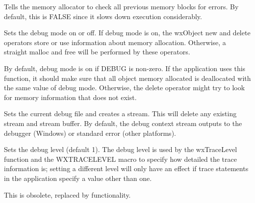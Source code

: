 \label{wxdebugcontextsetcheckprevious}


Tells the memory allocator to check all previous memory blocks for errors.
By default, this is FALSE since it slows down execution considerably.



\label{wxdebugcontextsetdebugmode}


Sets the debug mode on or off. If debug mode is on, the wxObject new and delete
operators store or use information about memory allocation. Otherwise,
a straight malloc and free will be performed by these operators.

By default, debug mode is on if DEBUG is non-zero. If the application
uses this function, it should make sure that all object memory allocated
is deallocated with the same value of debug mode. Otherwise, the
delete operator might try to look for memory information that does not
exist.



\label{wxdebugcontextsetfile}


Sets the current debug file and creates a stream. This will delete any existing
stream and stream buffer. By default, the debug context stream
outputs to the debugger (Windows) or standard error (other platforms).

\label{wxdebugcontextsetlevel}


Sets the debug level (default 1). The debug level is used by the wxTraceLevel function and
the WXTRACELEVEL macro to specify how detailed the trace information is; setting
a different level will only have an effect if trace statements in the application
specify a value other than one.

This is obsolete, replaced by  functionality.

